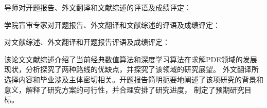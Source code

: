 \cleardoublepage

{
    \bfseries

    {
        \noindent 导师对开题报告、外文翻译和文献综述的评语及成绩评定：
    }


    \vspace{50mm}
    \thesisproposaleval[9][13][4]
    \signature{导师签名}

    {
        \noindent 学院盲审专家对开题报告、外文翻译和文献综述的评语及成绩评定：
    }


    \mbox{} \vfill
    \thesisproposaleval
    \signature{开题报告审核负责人（签名/签章）}
}
{
    \bfseries

    {
        \noindent 对文献综述、外文翻译和开题报告评语及成绩评定：
    }

    该论文文献综述介绍了当前经典数值算法和深度学习算法在求解PDE领域的发展现状，分析探究了两种路线的优缺点，并探究了该领域的研究展望。
    外文翻译所选择内容和毕业涉及主体密切相关。开题报告简明扼要地阐述了该项研究的背景和意义，解释了研究方案的可行性，并合理安排了研究进度，
    制定了预期研究目标。

    \mbox{} \vfill
    \thesisproposaleval[9][13][4]
    \signature{开题报告答辩小组负责人（签名）}
}
